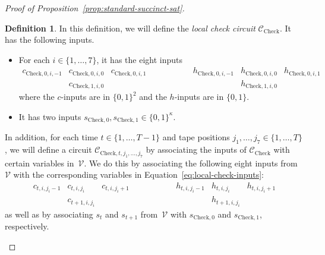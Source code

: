 \documentclass[11pt]{article}
\theoremstyle{definition}
\newtheorem{definition}[theorem]{Definition}
\newcommand{\circuit}{\mathcal{C}}
\begin{document}
\begin{proof}[Proof of Proposition~\ref{prop:standard-succinct-sat}]
  \begin{definition}\label{def:local-check-circuit}
    In this definition, we will define the \emph{local check circuit}
    $\circuit_{\mathrm{Check}}$.
    It has the following inputs.
    \begin{itemize}
    \item For each $i \in \{1, \ldots, 7\}$, it has the eight inputs
      \begin{equation}
        \label{eq:local-check-inputs}
        \begin{matrix}
          c_{\mathrm{Check}, 0, i, -1} & c_{\mathrm{Check}, 0, i, 0} &
          c_{\mathrm{Check}, 0, i, 1} & \qquad\qquad &
          h_{\mathrm{Check}, 0, i, -1} & h_{\mathrm{Check}, 0, i, 0} &
          h_{\mathrm{Check}, 0, i, 1} \\
          & c_{\mathrm{Check}, 1, i, 0} & & & &
          h_{\mathrm{Check}, 1, i, 0} &
        \end{matrix}
      \end{equation}
      where the $c$-inputs are in $\{0, 1\}^2$ and the $h$-inputs are in $\{0,
      1\}$.
    \item It has two inputs $s_{\mathrm{Check}, 0}, s_{\mathrm{Check}, 1} \in
      \{0, 1\}^\kappa$.
    \end{itemize}
    In addition, for each time $t \in \{1, \ldots, T-1\}$ and tape positions
    $j_1, \ldots, j_7 \in \{1, \ldots, T\}$, we will define a circuit
    $\circuit_{\mathrm{Check}, t, j_1, \ldots, j_7}$ by associating the inputs
    of $\circuit_{\mathrm{Check}}$ with certain variables in~$\mathcal{V}$.
    We do this by associating the following eight inputs from~$\mathcal{V}$ with
    the corresponding variables in Equation~\eqref{eq:local-check-inputs}:
    \begin{equation*}
      \begin{matrix}
        c_{t, i, j_i-1} & c_{t, i, j_i} & c_{t, i, j_i+1} & \qquad\qquad &
        h_{t, i, j_i-1} & h_{t, i, j_i} & h_{t, i, j_i+1} \\
        & c_{t+1, i, j_i} & & & & h_{t+1, i, j_i} &
      \end{matrix}
    \end{equation*}
    as well as by associating $s_t$ and $s_{t+1}$ from~$\mathcal{V}$ with
    $s_{\mathrm{Check}, 0}$ and $s_{\mathrm{Check},1}$, respectively.


\end{definition}
\end{proof}
\end{document}
